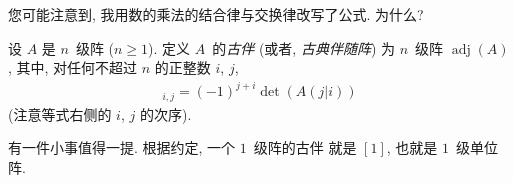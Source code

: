 您可能注意到,
我用数的乘法的结合律与交换律改写了公式.
为什么?

\begin{definition}[古伴]
    设 \(A\) 是 \(n\)~级阵 (\(n \geq 1\)).
    定义 \(A\)~的\emph{古伴}
    (或者, \emph{古典伴随阵})
    为 \(n\)~级阵 \(\operatorname{adj} {(A)}\),
    其中, 对任何不超过 \(n\) 的正整数 \(i\), \(j\),
    \begin{align*}
        [\operatorname{adj} {(A)}]_{i,j}
        = (-1)^{j+i} \det {(A(j|i))}
    \end{align*}
    (注意等式右侧的 \(i\), \(j\) 的次序).
\end{definition}

有一件小事值得一提.
根据约定, 一个 \(1\)~级阵的古伴%
就是 \([1]\),
也就是 \(1\)~级单位阵.


